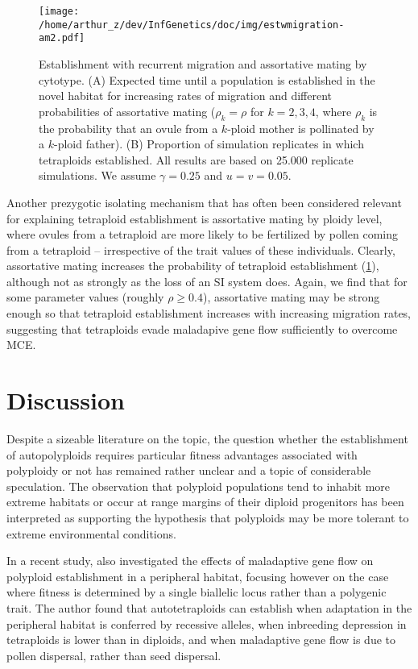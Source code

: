 \documentclass[12pt,a4paper]{article}
\begin{document}
\begin{figure}
\texttt{[image: /home/arthur\_z/dev/InfGenetics/doc/img/estwmigration-am2.pdf]}
\caption{
Establishment with recurrent migration and assortative mating by cytotype.
(A) Expected time until a population is established in the novel habitat for
increasing rates of migration and different probabilities of assortative mating
($\rho_k = \rho$ for $k=2,3,4$, where $\rho_k$ is the probability that an ovule
from a $k$-ploid mother is pollinated by a $k$-ploid father).
(B) Proportion of simulation replicates in which tetraploids established. 
All results are based on 25.000 replicate simulations.
We assume $\gamma=0.25$ and $u=v=0.05$.
\label{fig:am}}
\end{figure}

Another prezygotic isolating mechanism that has often been considered relevant
for explaining tetraploid establishment is assortative mating by ploidy level,
where ovules from a tetraploid are more likely to be fertilized by
pollen coming from a tetraploid -- irrespective of the trait values of these
individuals.
Clearly, assortative mating increases the probability of tetraploid
establishment (\cref{fig:am}), although not as strongly as the loss of an SI
system does.
Again, we find that for some parameter values (roughly $\rho \ge 0.4$),
assortative mating may be strong enough so that tetraploid establishment
increases with increasing migration rates, suggesting that tetraploids evade
maladapive gene flow sufficiently to overcome MCE.

\section*{Discussion}

Despite a sizeable literature on the topic, the question whether the
establishment of autopolyploids requires particular fitness advantages
associated with polyploidy or not has remained rather unclear and a topic of
considerable speculation.
The observation that polyploid populations tend to inhabit more extreme
habitats or occur at range margins of their diploid progenitors has been
interpreted as supporting the hypothesis that polyploids may be more tolerant
to extreme environmental conditions.

In a recent study, \cite{griswold2021} also investigated the effects of
maladaptive gene flow on polyploid establishment in a peripheral habitat,
focusing however on the case where fitness is determined by a single biallelic
locus rather than a polygenic trait.
The author found that autotetraploids can establish when adaptation in the
peripheral habitat is conferred by recessive alleles, when inbreeding
depression in tetraploids is lower than in diploids, and when maladaptive gene
flow is due to pollen dispersal, rather than seed dispersal.
\end{document}
